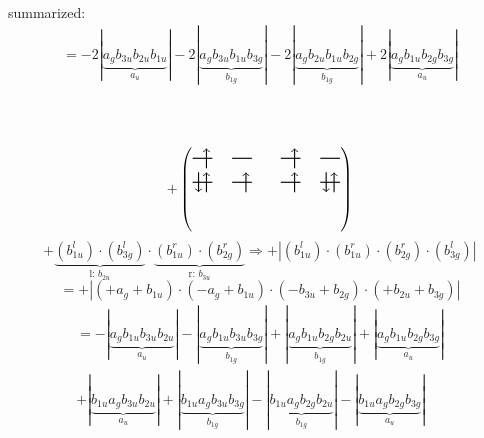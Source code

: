 \documentclass{article}
\begin{document}
\begin{multline*}
\end{multline*}summarized:\begin{multline*}
=-2\left|\underbrace{a_{g} b_{3u} b_{2u} b_{1u}}_{a_{u}}\right|-2\left|\underbrace{a_{g} b_{3u} b_{1u} b_{3g}}_{b_{1g}}\right|-2\left|\underbrace{a_{g} b_{2u} b_{1u} b_{2g}}_{b_{1g}}\right|+2\left|\underbrace{a_{g} b_{1u} b_{2g} b_{3g}}_{a_{u}}\right|\\
\end{multline*}\\ \\
\vspace{0.5cm}

\[+\left(\begin{tikzpicture}
    \draw[thick] (0,0) -- (0.5,0); %
    \draw[thick] (1,0) -- (1.5,0); %
    \draw[thick] (0,-0.6) -- (0.5,-0.6); %
    \draw[thick] (1,-0.6) -- (1.5,-0.6); %
\draw[->, thick] (0.35, -0.25) -- (0.35, 0.25); 
\draw[-> , thick] (0.35, -0.85) -- (0.35, -0.35); 
\draw[<- , thick] (0.15, -0.85) -- (0.15, -0.35); 
 \draw[-> , thick] (1.35, -0.85) -- (1.35, -0.35); 
\end{tikzpicture}\qquad \begin{tikzpicture}
    \draw[thick] (0,0) -- (0.5,0); %
    \draw[thick] (1,0) -- (1.5,0); %
    \draw[thick] (0,-0.6) -- (0.5,-0.6); %
    \draw[thick] (1,-0.6) -- (1.5,-0.6); %
\draw[->, thick] (0.35, -0.25) -- (0.35, 0.25); 
\draw[-> , thick] (0.35, -0.85) -- (0.35, -0.35); 
 \draw[-> , thick] (1.35, -0.85) -- (1.35, -0.35); 
\draw[<- , thick] (1.15, -0.85) -- (1.15, -0.35); 
\end{tikzpicture}\right)\]$$+ \underbrace{(b_{1u}^{l})\cdot (b_{3g}^{l})}_{\text{l: }b_{2u}}\cdot \underbrace{(b_{1u}^{r})\cdot (b_{2g}^{r})}_{\text{r: }b_{3u}}\Rightarrow +\left|(b_{1u}^{l}) \cdot (b_{1u}^{r}) \cdot (b_{2g}^{r}) \cdot (b_{3g}^{l})\right|$$$$=+\left|(+a_{g}+b_{1u}) \cdot (-a_{g}+b_{1u}) \cdot (-b_{3u}+b_{2g}) \cdot (+b_{2u}+b_{3g})\right|$$\begin{multline*}
=-\left|\underbrace{a_{g} b_{1u} b_{3u} b_{2u}}_{a_{u}}\right|-\left|\underbrace{a_{g} b_{1u} b_{3u} b_{3g}}_{b_{1g}}\right|+\left|\underbrace{a_{g} b_{1u} b_{2g} b_{2u}}_{b_{1g}}\right|+\left|\underbrace{a_{g} b_{1u} b_{2g} b_{3g}}_{a_{u}}\right|\\
+\left|\underbrace{b_{1u} a_{g} b_{3u} b_{2u}}_{a_{u}}\right|+\left|\underbrace{b_{1u} a_{g} b_{3u} b_{3g}}_{b_{1g}}\right|-\left|\underbrace{b_{1u} a_{g} b_{2g} b_{2u}}_{b_{1g}}\right|-\left|\underbrace{b_{1u} a_{g} b_{2g} b_{3g}}_{a_{u}}\right|\\

\end{multline*}
\end{document}
